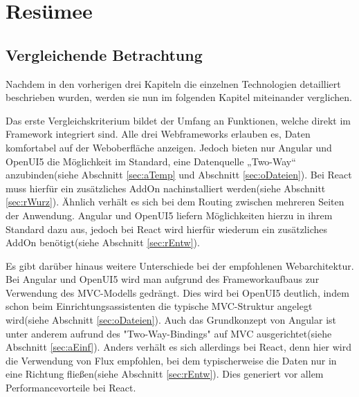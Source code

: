

\chapter{Resümee}
\section{Vergleichende Betrachtung}\label{sec:vergl}

Nachdem in den vorherigen drei Kapiteln die einzelnen Technologien detailliert beschrieben wurden, werden sie nun im folgenden Kapitel miteinander verglichen.

Das erste Vergleichskriterium bildet der Umfang an Funktionen, welche direkt im Framework integriert sind. Alle drei Webframeworks erlauben es, Daten komfortabel auf der Weboberfläche anzeigen. Jedoch bieten nur Angular und OpenUI5 die Möglichkeit im Standard, eine Datenquelle „Two-Way“ anzubinden(siehe Abschnitt \ref{sec:aTemp} und Abschnitt  \ref{sec:oDateien}). Bei React muss hierfür ein zusätzliches AddOn nachinstalliert werden(siehe Abschnitt \ref{sec:rWurz}). Ähnlich verhält es sich bei dem Routing zwischen mehreren Seiten der Anwendung. Angular und OpenUI5 liefern Möglichkeiten hierzu in ihrem Standard dazu aus, jedoch bei React wird hierfür wiederum ein zusätzliches AddOn benötigt(siehe Abschnitt \ref{sec:rEntw}). 

Es gibt darüber hinaus weitere Unterschiede bei der empfohlenen Webarchitektur. Bei Angular und OpenUI5 wird man aufgrund des Frameworkaufbaus zur Verwendung des MVC-Modells gedrängt. Dies wird bei OpenUI5 deutlich, indem schon beim Einrichtungsassistenten die typische MVC-Struktur angelegt wird(siehe Abschnitt \ref{sec:oDateien}). Auch das Grundkonzept von Angular ist unter anderem aufrund des "Two-Way-Bindings" auf MVC ausgerichtet(siehe Abschnitt \ref{sec:aEinf}). Anders verhält es sich allerdings bei React, denn hier wird die Verwendung von Flux empfohlen, bei dem typischerweise die Daten nur in eine Richtung fließen(siehe Abschnitt \ref{sec:rEntw}). Dies generiert vor allem Performancevorteile bei React.

